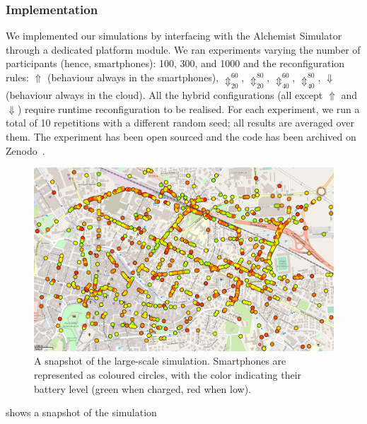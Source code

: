 \documentclass[conference]{IEEEtran}
\begin{document}
\subsubsection{Implementation}
We implemented our simulations by interfacing \ourframework{}
with the Alchemist Simulator~\cite{PianiniJOS2013}
through a dedicated platform module.
%
We ran experiments varying the number of participants (hence, smartphones): 100, 300, and 1000
and the \ourframework{} reconfiguration rules:
$\Uparrow$ (behaviour always in the smartphones),
$\Updownarrow^{60}_{20}$,
$\Updownarrow^{80}_{20}$,
$\Updownarrow^{60}_{40}$,
$\Updownarrow^{80}_{40}$,
$\Downarrow$ (behaviour always in the cloud).
%
All the hybrid configurations
(all except $\Uparrow$ and $\Downarrow$)
require runtime reconfiguration to be realised.
%
For each experiment, we run a total of 10 repetitions with a different random seed;
all results are averaged over them.
%
The experiment has been open sourced
and the code has been archived on Zenodo~\cite{https://doi.org/10.5281/zenodo.7948801}.
%
\begin{figure}
    \includegraphics[width=\linewidth]{figures/simulation-screenshot.png}
    \caption{
        A snapshot of the large-scale simulation.
        Smartphones are represented as coloured circles,
        with the color indicating their battery level
        (green when charged, red when low).
    }
    \label{fig:simulation-screenshot}
\end{figure}
%
 shows a snapshot of the simulation
\end{document}
